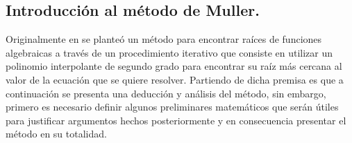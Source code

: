 \subsection{Introducción al método de Muller.}
Originalmente en \cite{muller1956method} se planteó un método para encontrar raíces de funciones algebraicas
a través de un procedimiento iterativo que consiste en utilizar un polinomio interpolante de segundo 
grado para encontrar su raíz más cercana al valor de la ecuación que se quiere resolver. Partiendo de dicha premisa es que
a continuación se presenta una deducción y análisis del método, sin embargo, primero es necesario definir algunos preliminares
matemáticos que serán útiles para justificar argumentos hechos posteriormente y en consecuencia presentar el método en su totalidad.